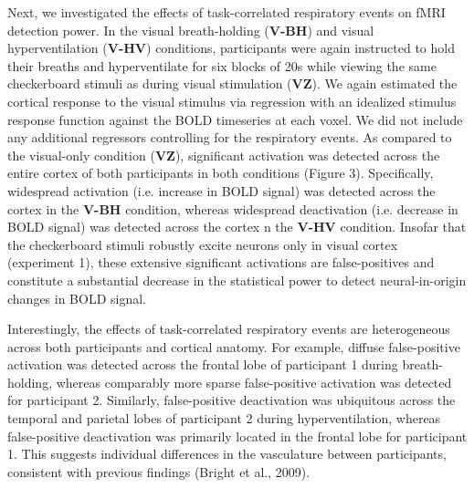 \documentclass[9pt]{NEU502b-fmri}
\begin{document}
Next, we investigated the effects of task-correlated respiratory events on fMRI detection power.  In the visual breath-holding (\textbf{V-BH}) and visual hyperventilation (\textbf{V-HV}) conditions, participants were again instructed to hold their breaths and hyperventilate for six blocks of 20s while viewing the same checkerboard stimuli as during visual stimulation (\textbf{VZ}). We again estimated the cortical response to the visual stimulus via regression with an idealized stimulus response function against the BOLD timeseries at each voxel. We did not include any additional regressors controlling for the respiratory events. As compared to the visual-only condition (\textbf{VZ}), significant activation was detected across the entire cortex of both participants in both conditions (Figure 3). Specifically, widespread activation (i.e. increase in BOLD signal) was detected across the cortex in the \textbf{V-BH} condition, whereas widespread deactivation (i.e. decrease in BOLD signal) was detected across the cortex n the \textbf{V-HV} condition. Insofar that the checkerboard stimuli robustly excite neurons only in visual cortex (experiment 1), these extensive significant activations are false-positives and constitute a substantial decrease in the statistical power to detect neural-in-origin changes in BOLD signal. 

Interestingly, the effects of task-correlated respiratory events are heterogeneous across both participants and cortical anatomy. For example, diffuse false-positive activation was detected across the frontal lobe of participant 1 during breath-holding, whereas comparably more sparse  false-positive activation was detected for participant 2. Similarly, false-positive deactivation was ubiquitous across the temporal and parietal lobes of participant 2 during hyperventilation, whereas false-positive deactivation was primarily located in the frontal lobe for participant 1. This suggests individual differences in the vasculature between participants, consistent with previous findings (Bright et al., 2009). 
\end{document}
